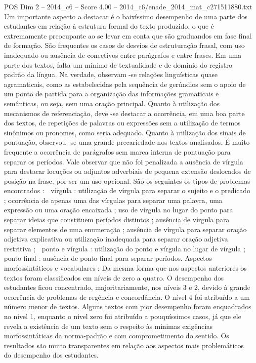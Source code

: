 \begin{textsample}{POS Dim 2 – 2014\_c6 – Score 4.00 – 2014\_c6/enade\_2014\_mat\_c271511880.txt}
Um importante aspecto a destacar é o baixíssimo desempenho de uma parte dos estudantes em relação à estrutura formal do texto produzido, o que é extremamente preocupante ao se levar em conta que são graduandos em fase final de formação.
São frequentes os casos de desvios de estruturação frasal, com uso inadequado ou ausência de conectivos entre parágrafos e entre frases.
Em uma parte dos textos, falta um mínimo de textualidade e de domínio do registro padrão da língua.
Na verdade, observam -se relações linguísticas quase agramaticais, como as estabelecidas pela sequência de gerúndios sem o apoio de um ponto de partida para a organização das informações gramaticais e semânticas, ou seja, sem uma oração principal.
Quanto à utilização dos mecanismos de referenciação, deve -se destacar a ocorrência, em uma boa parte dos textos, de repetições de palavras ou expressões sem a utilização de termos sinônimos ou pronomes, como seria adequado.
Quanto à utilização dos sinais de pontuação, observou -se uma grande precariedade nos textos analisados.
É muito frequente a ocorrência de parágrafos sem marca interna de pontuação para separar os períodos.
Vale observar que não foi penalizada a ausência de vírgula para destacar locuções ou adjuntos adverbiais de pequena extensão deslocados de posição na frase, por ser um uso opcional.
São os seguintes os tipos de problemas encontrados :  vírgula : utilização de vírgula para separar o sujeito e o predicado ; ocorrência de apenas uma das vírgulas para separar uma palavra, uma expressão ou uma oração encaixada ; uso de vírgula no lugar do ponto para separar ideias que constituem períodos distintos ; ausência de vírgula para separar elementos de uma enumeração ; ausência de vírgula para separar oração adjetiva explicativa ou utilização inadequada para separar oração adjetiva restritiva ;  ponto e vírgula : utilização do ponto e vírgula no lugar de vírgula ;  ponto final : ausência de ponto final para separar períodos.
Aspectos morfossintáticos e vocabulares : Da mesma forma que nos aspectos anteriores os textos foram classificados em níveis de zero a quatro.
O desempenho dos estudantes ficou concentrado, majoritariamente, nos níveis 3 e 2, devido à grande ocorrência de problemas de regência e concordância.
O nível 4 foi atribuído a um número menor de textos.
Alguns textos com pior desempenho foram enquadrados no nível 1, enquanto o nível zero foi atribuído a pouquíssimos casos, já que ele revela a existência de um texto sem o respeito às mínimas exigências morfossintáticas da norma-padrão e com comprometimento do sentido.
Os resultados são muito transparentes em relação aos aspectos mais problemáticos do desempenho dos estudantes.

\end{textsample}
